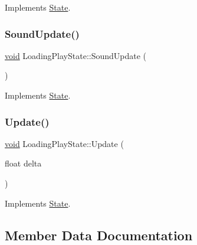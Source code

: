 Implements \hyperlink{classState_a0e48dfae1e3090630475812681417c5f}{State}.

\mbox{\label{classLoadingPlayState_a8676ff36334ce4de33a9874fe4a54c3f}} 
\subsubsection{\texorpdfstring{Sound\+Update()}{SoundUpdate()}}
{\footnotesize\ttfamily \hyperlink{imgui__impl__opengl3__loader_8h_ac668e7cffd9e2e9cfee428b9b2f34fa7}{void} Loading\+Play\+State\+::\+Sound\+Update (\begin{DoxyParamCaption}{ }\end{DoxyParamCaption})\hspace{0.3cm}{\ttfamily [virtual]}}



Implements \hyperlink{classState_a6572089fbf2178bf5c582cc27d6d3925}{State}.

\mbox{\label{classLoadingPlayState_adab55fbf70ddda174590a55d59ec355b}} 
\subsubsection{\texorpdfstring{Update()}{Update()}}
{\footnotesize\ttfamily \hyperlink{imgui__impl__opengl3__loader_8h_ac668e7cffd9e2e9cfee428b9b2f34fa7}{void} Loading\+Play\+State\+::\+Update (\begin{DoxyParamCaption}\item[{float}]{delta }\end{DoxyParamCaption})\hspace{0.3cm}{\ttfamily [virtual]}}



Implements \hyperlink{classState_aac0d3fdee1341e168af730b8f31a7bf1}{State}.



\subsection{Member Data Documentation}
\mbox{\label{classLoadingPlayState_ace02ea66ec0d0970fc523aca12cf9c24}} 
